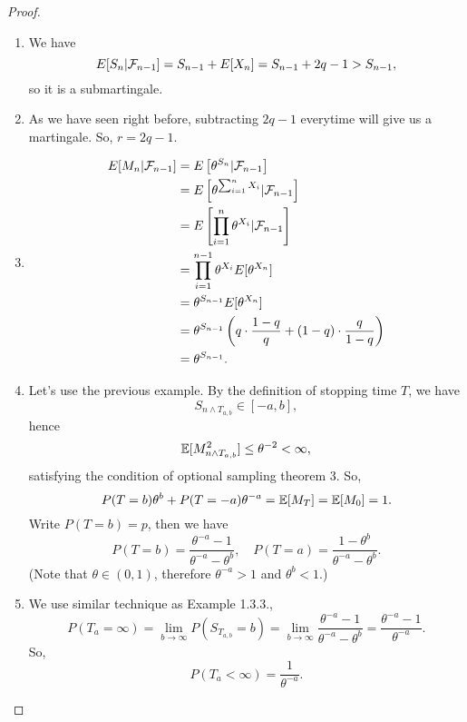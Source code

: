 \documentclass[a4paper]{article}\usepackage{amsmath,amssymb,amsthm,tikz,hyperref,mathtools,mathrsfs}
\begin{document}
\begin{proof}
  \begin{enumerate}
    \item We have
    \[
      E[S_n | \mathcal{F}_{n-1}] = S_{n-1} + E[X_n] = S_{n-1} + 2q-1 > S_{n-1},
    \]
    so it is a submartingale.
    \item As we have seen right before, subtracting $2q-1$ everytime will give us a martingale. 
    So, $r = 2q-1$.
    \item 
    \begin{align*}
      E[M_n | \mathcal{F}_{n-1}] &= E\left[\theta^{S_n} | \mathcal{F}_{n-1}\right]
      \\
      {} &= E \left[\theta^{\sum_{i=1}^n X_i} | \mathcal{F}_{n-1}\right]
      \\
      {} &= E \left[ \prod_{i=1}^n \theta^{X_i} | \mathcal{F}_{n-1} \right]
      \\
      {} &= \prod_{i=1}^{n-1} \theta^{X_i} E[\theta^{X_n}]
      \\
      {} &= \theta^{S_{n-1}} E[\theta^{X_n}]
      \\
      {} &= \theta^{S_{n-1}} \left( q \cdot \frac{1-q}{q} + (1-q) \cdot \frac{q}{1-q} \right)
      \\
      {} &= \theta^{S_{n-1}}.
    \end{align*}
    \item Let's use the previous example. By the definition of stopping time $T$, we have
    \[
      S_{n \wedge T_{a,b}} \in [-a, b],
    \]
    hence
    \[
      \operatorname*{\mathbb{E}}[M_{n \wedge T_{a,b}}^2] \le \theta^{-2} < \infty,
    \]
    satisfying the condition of optional sampling theorem 3.
    So,
    \[
      P(T=b) \theta^b + P(T=-a) \theta^{-a} = \operatorname*{\mathbb{E}}[M_T] = \operatorname*{\mathbb{E}}[M_0] = 1.
    \]
    Write $P(T=b) = p$, then we have
    \[
      P(T=b) = \frac{\theta^{-a} - 1}{\theta^{-a} - \theta^b}, \quad P(T=a) = \frac{1 - \theta^b}{\theta^{-a} - \theta^b}.
    \]
    (Note that $\theta \in (0, 1)$, therefore $\theta^{-a} > 1$ and $\theta^b < 1$.)
    \item We use similar technique as Example 1.3.3., 
    \[
      P(T_a = \infty) = \lim_{b \to \infty} P(S_{T_{a,b}} = b) = \lim_{b \to \infty} \frac{\theta^{-a} - 1}{\theta^{-a} - \theta^b} = \frac{\theta^{-a} - 1}{\theta^{-a}}.
    \]
    So,
    \[
      P(T_a < \infty) = \frac{1}{\theta^{-a}}.
    \]
  \end{enumerate}
\end{proof}
\end{document}
